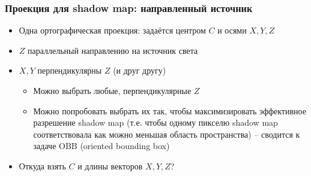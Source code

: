 \documentclass{beamer}
\begin{document}
\begin{frame}[fragile]
\frametitle{Проекция для shadow map: направленный источник}
\begin{itemize}
\item Одна ортографическая проекция: задаётся центром \begin{math}C\end{math} и осями \begin{math}X, Y, Z\end{math}
\pause
\item \begin{math}Z\end{math} параллельный направлению на источник света
\pause
\item \begin{math}X, Y\end{math} перпендикулярны \begin{math}Z\end{math} (и друг другу)
\begin{itemize}
\item Можно выбрать любые, перпендикулярные \begin{math}Z\end{math}
\item Можно попробовать выбрать их так, чтобы максимизировать эффективное разрешение shadow map (т.е. чтобы одному пикселю shadow map соответствовала как можно меньшая область пространства) -- сводится к задаче OBB (oriented bounding box)
\end{itemize}
\pause
\item Откуда взять \begin{math}C\end{math} и длины векторов \begin{math}X,Y,Z\end{math}?
\end{itemize}
\end{frame}
\end{document}
